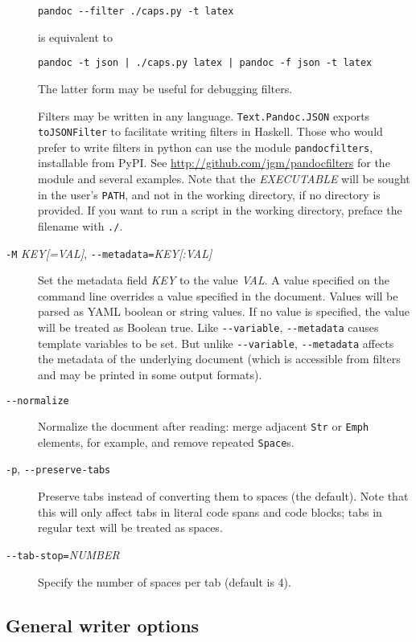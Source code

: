 \documentclass[]{article}
\begin{document}
\begin{description}
\begin{verbatim}
pandoc --filter ./caps.py -t latex
\end{verbatim}

is equivalent to

\begin{verbatim}
pandoc -t json | ./caps.py latex | pandoc -f json -t latex
\end{verbatim}

The latter form may be useful for debugging filters.

Filters may be written in any language. \texttt{Text.Pandoc.JSON}
exports \texttt{toJSONFilter} to facilitate writing filters in Haskell.
Those who would prefer to write filters in python can use the module
\texttt{pandocfilters}, installable from PyPI. See
\url{http://github.com/jgm/pandocfilters} for the module and several
examples. Note that the \emph{EXECUTABLE} will be sought in the user's
\texttt{PATH}, and not in the working directory, if no directory is
provided. If you want to run a script in the working directory, preface
the filename with \texttt{./}.
\item[\texttt{-M} \emph{KEY{[}=VAL{]}},
\texttt{-{}-metadata=}\emph{KEY{[}:VAL{]}}]
Set the metadata field \emph{KEY} to the value \emph{VAL}. A value
specified on the command line overrides a value specified in the
document. Values will be parsed as YAML boolean or string values. If no
value is specified, the value will be treated as Boolean true. Like
\texttt{-{}-variable}, \texttt{-{}-metadata} causes template variables
to be set. But unlike \texttt{-{}-variable}, \texttt{-{}-metadata}
affects the metadata of the underlying document (which is accessible
from filters and may be printed in some output formats).
\item[\texttt{-{}-normalize}]
Normalize the document after reading: merge adjacent \texttt{Str} or
\texttt{Emph} elements, for example, and remove repeated
\texttt{Space}s.
\item[\texttt{-p}, \texttt{-{}-preserve-tabs}]
Preserve tabs instead of converting them to spaces (the default). Note
that this will only affect tabs in literal code spans and code blocks;
tabs in regular text will be treated as spaces.
\item[\texttt{-{}-tab-stop=}\emph{NUMBER}]
Specify the number of spaces per tab (default is 4).
\end{description}

\subsection{General writer options}\label{general-writer-options}
\end{document}

